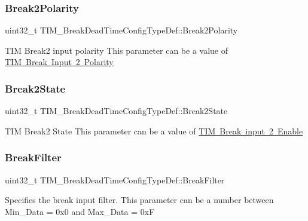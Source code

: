 \subsubsection{\texorpdfstring{Break2Polarity}{Break2Polarity}}
{\footnotesize\ttfamily uint32\+\_\+t T\+I\+M\+\_\+\+Break\+Dead\+Time\+Config\+Type\+Def\+::\+Break2\+Polarity}

T\+IM Break2 input polarity This parameter can be a value of \mbox{\hyperlink{group___t_i_m___break2___polarity}{T\+IM Break Input 2 Polarity}} \mbox{\label{struct_t_i_m___break_dead_time_config_type_def_ab9a983671c730c9b33852c9aa60846fb}} 
\subsubsection{\texorpdfstring{Break2State}{Break2State}}
{\footnotesize\ttfamily uint32\+\_\+t T\+I\+M\+\_\+\+Break\+Dead\+Time\+Config\+Type\+Def\+::\+Break2\+State}

T\+IM Break2 State This parameter can be a value of \mbox{\hyperlink{group___t_i_m___break2___input__enable__disable}{T\+IM Break input 2 Enable}} \mbox{\label{struct_t_i_m___break_dead_time_config_type_def_aad8158e694a62f6c071975ee4c2e5b6a}} 
\subsubsection{\texorpdfstring{BreakFilter}{BreakFilter}}
{\footnotesize\ttfamily uint32\+\_\+t T\+I\+M\+\_\+\+Break\+Dead\+Time\+Config\+Type\+Def\+::\+Break\+Filter}

Specifies the break input filter. This parameter can be a number between Min\+\_\+\+Data = 0x0 and Max\+\_\+\+Data = 0xF \mbox{\label{struct_t_i_m___break_dead_time_config_type_def_ae15ddbf3087f9a2129a52a1317339ea7}} 
